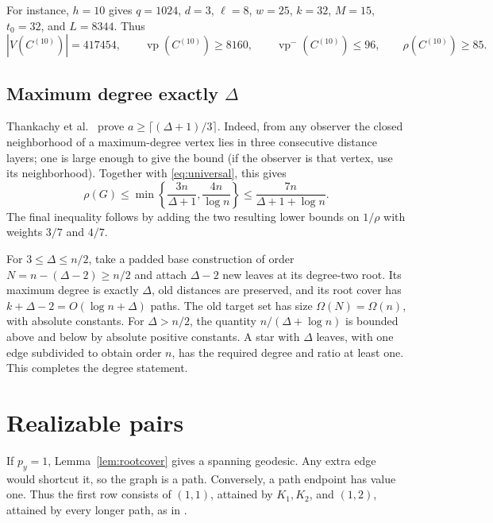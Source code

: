 \documentclass[11pt]{article}
\theoremstyle{remark}\newtheorem{remark}[theorem]{Remark}
\newcommand{\vp}{\operatorname{vp}}
\newcommand{\vpm}{\operatorname{vp}^{-}}
\begin{document}
For instance, $h=10$ gives $q=1024$, $d=3$, $\ell=8$, $w=25$, $k=32$,
$M=15$, $t_0=32$, and $L=8344$. Thus
\begin{equation}\label{eq:concrete}
 |V(C^{(10)})|=417454,\qquad \vp(C^{(10)})\ge8160,\qquad
 \vpm(C^{(10)})\le96,\qquad \rho(C^{(10)})\ge85.
\end{equation}

\subsection{Maximum degree exactly \texorpdfstring{$\Delta$}{Delta}}
Thankachy et al.\ \cite[Theorem 2.9]{position} prove
$a\ge\lceil(\Delta+1)/3\rceil$. Indeed, from any observer the closed
neighborhood of a maximum-degree vertex lies in three consecutive distance
layers; one is large enough to give the bound (if the observer is that
vertex, use its neighborhood). Together with \eqref{eq:universal}, this gives
\[
 \rho(G)\le\min\left\{\frac{3n}{\Delta+1},\frac{4n}{\log n}\right\}
        \le\frac{7n}{\Delta+1+\log n}.
\]
The final inequality follows by adding the two resulting lower bounds on
$1/\rho$ with weights $3/7$ and $4/7$.

For $3\le\Delta\le n/2$, take a padded base construction of order
$N=n-(\Delta-2)\ge n/2$ and attach $\Delta-2$ new leaves at its degree-two
root. Its maximum degree is exactly $\Delta$, old distances are preserved,
and its root cover has $k+\Delta-2=O(\log n+\Delta)$ paths. The old target
set has size $\Omega(N)=\Omega(n)$, with absolute constants. For
$\Delta>n/2$, the quantity $n/(\Delta+\log n)$ is bounded above and below
by absolute positive constants. A star with $\Delta$ leaves, with one edge
subdivided to obtain order $n$, has the required degree and ratio at least
one. This completes the degree statement.

\section{Realizable pairs}
If $p_y=1$, Lemma~\ref{lem:rootcover} gives a spanning geodesic. Any extra
edge would shortcut it, so the graph is a path. Conversely, a path endpoint
has value one. Thus the first row consists of $(1,1)$, attained by $K_1,K_2$,
and $(1,2)$, attained by every longer path, as in
\cite[Corollary 2.7]{position}.
\end{document}
